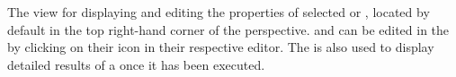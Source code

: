 \item[\gdpropview]{
The view for displaying and editing the properties of selected \gdsteps or 
\gdcases{}, located by default in the top right-hand corner of 
the perspective. 
 \gdsteps and 
\gdcases can be edited in the \gdpropview by clicking on their icon in their
respective editor. The \gdpropview
 is also used to display detailed results of a \gdsuite 
once it has been executed.
}
